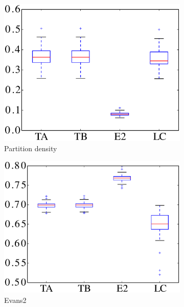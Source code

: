 \begin{figure}
\centering
	\begin{subfigure}{0.31\textwidth}
		\includegraphics[width=\linewidth]{img/ExpectedNodes/LF/LFR1_Partitiondensity_ALL.eps}
		\caption{\label{fig:LFAhn}Partition density}		
	\end{subfigure}
	\begin{subfigure}{0.31\textwidth}
		\includegraphics[width=\linewidth]{img/ExpectedNodes/LF/LFR1_Evans2_ALL.eps}
		\caption{\label{fig:LFE2}Evans2}		
	\end{subfigure}
	\begin{subfigure}{0.31\textwidth}

\end{subfigure}
\end{figure}
